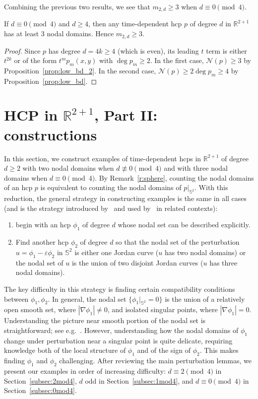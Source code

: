 \documentclass[10pt]{amsart}
\theoremstyle{definition}\newtheorem{defi}[theo]{Definition}\newtheorem{rema}[theo]{Remark}\newtheorem{exam}[theo]{Example}\newtheorem{exem}[theo]{Example}\newtheorem{nota}[theo]{Notation}
\newcommand{\R}{\mathbb{R}}
\newcommand{\sphere}{\mathbb{S}}
\newcommand{\nodal}{\mathcal{N}}
\renewcommand{\epsilon}{\varepsilon}
\newcommand*{\relabel}{
\renewcommand{\labelenumi}{(\theenumi)}}
\newcommand*{\alphenumi}{
\renewcommand*{\theenumi}{\alph{enumi}}\relabel}
\begin{document}
Combining the previous two results, we see that $m_{2,d} \ge 3$ when $d \equiv 0 \pmod 4$.
\begin{coro} \label{cor:0_mod_4}
If $d \equiv 0 \pmod 4$ and $d\geq 4$, then any time-dependent hcp $p$ of degree $d$ in $\R^{2+1}$ has at least $3$ nodal domains. Hence $m_{2,d}\geq 3$.
\end{coro}
\begin{proof}
Since $p$ has degree $d=4k\geq 4$ ({which is even}), its leading $t$ term is either $t^{2k}$ or of the form $t^m p_m(x,y)$ with $\deg p_m \ge 2$. In the first case, $\nodal(p)\geq 3$ by Proposition~\ref{prop:low_bd_2}. In the second case, $\nodal(p)\geq 2\deg p_m\geq 4$ by Proposition~\ref{prop:low_bd}.
\end{proof}


\section{HCP in \texorpdfstring{$\R^{2+1}$}{2+1 dimensions}, Part II: constructions} \label{sec:dim_3_constr}

In this section, we construct examples of time-dependent hcps in $\R^{2+1}$ of degree $d\geq 2$ with two nodal domains when $d \not \equiv 0 \pmod 4$ and with three nodal domains when $d \equiv 0 \pmod 4$. By Remark~\ref{r:sphere}, counting the nodal domains of an hcp $p$ is equivalent to counting the nodal domains of $p|_{\sphere^2}$. With this reduction, the general strategy in constructing examples is the same in all cases (and is the strategy introduced by~\cite{Lewy77} and used by~\cite{BH16,EJN07,LTY15} in related contexts):
\begin{enumerate}\alphenumi
\item begin with an hcp $\phi_1$ of degree $d$ whose nodal set can be described explicitly.
\item Find another hcp $\phi_2$ of degree $d$ so that the nodal set of the perturbation $u=\phi_1 - \epsilon \phi_2$ in $\sphere^2$ is either one Jordan curve ($u$ has two nodal domains) or the nodal set of $u$ is the union of two disjoint Jordan curves ($u$ has three nodal domains).
\end{enumerate}
The key difficulty in this strategy is finding certain compatibility conditions between $\phi_1, \phi_2$. In general, the nodal set $\{ \phi_1|_{\sphere^2} =0 \}$ is the union of a relatively open smooth set, where $|\nabla \phi_1|\neq 0$, and isolated singular points, where $|\nabla \phi_1|=0$. Understanding the picture near smooth portion of the nodal set is straightforward; see e.g.~\cite[Lemma~2]{Lewy77}. However, understanding how the nodal domains of $\phi_1$ change under perturbation near a singular point is quite delicate, requiring knowledge both of the local structure of $\phi_1$ and of the sign of $\phi_2$. This makes finding $\phi_1$ and $\phi_2$ challenging. After reviewing the main perturbation lemmas, we present our examples in order of increasing difficulty: $d\equiv 2\pmod 4$ in Section~\ref{subsec:2mod4}, $d$ odd in Section~\ref{subsec:1mod4}, and $d\equiv 0\pmod 4$ in Section~\ref{subsec:0mod4}.
\end{document}

